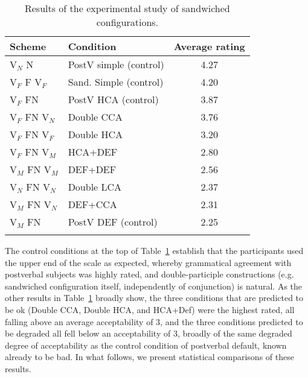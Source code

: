 \documentclass[output=paper
,modfonts
,nonflat]{langsci/langscibook}
\begin{document}
\begin{table}
\begin{tabularx}{\textwidth}{lXc}
	\lsptoprule
Scheme & Condition & Average rating \\ \midrule
V$_N$ N & PostV simple (control) & 4.27 \\ \midrule
V$_F$ F V$_F$ & Sand. Simple (control) & 4.20 \\ \midrule
V$_F$ FN & PostV HCA (control) & 3.87 \\ \midrule
V$_F$ FN V$_N$ & Double CCA & 3.76 \\ \midrule
V$_F$ FN V$_F$ & Double HCA & 3.20 \\ \midrule
V$_F$ FN V$_M$ & HCA+DEF & 2.80 \\ \midrule
V$_M$ FN V$_M$ & DEF+DEF & 2.56 \\ \midrule
V$_N$ FN V$_N$ & Double LCA & 2.37 \\ \midrule
V$_M$ FN V$_N$ & DEF+CCA & 2.31 \\ \midrule
V$_M$ FN & PostV DEF (control) & 2.25 \\ 
\lspbottomrule
\end{tabularx}
\caption{Results of the experimental study of sandwiched configurations.}
\label{tab:results}
\end{table}
\newpage \noindent The control conditions at the top of Table~\ref{tab:results} establish that the participants used the upper end of the scale as expected, whereby grammatical agreement with postverbal subjects was highly rated, and double-participle constructions (e.g. sandwiched configuration itself, independently of conjunction) is natural. As the other results in Table~\ref{tab:results} broadly show, the three conditions that are predicted to be ok (Double CCA, Double HCA, and HCA+Def) were the highest rated, all falling above an average acceptability of 3, and the three conditions predicted to be degraded all fell below an acceptability of 3, broadly of the same degraded degree of acceptability as the control condition of postverbal default, known already to be bad. In what follows, we present statistical comparisons of these results. 


\end{document}
